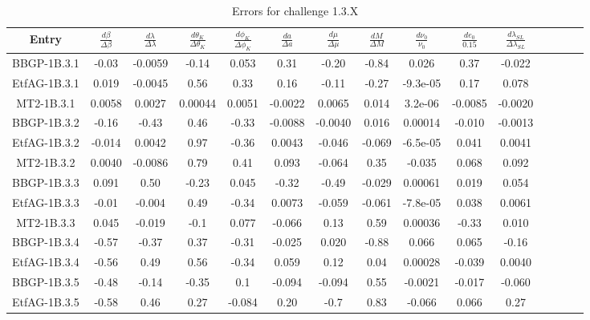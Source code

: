 \documentclass{iopart}
\begin{document}
 \begin{table}
\caption{\label{EMRI1} Errors for challenge 1.3.X}
\begin{tabular}{|c|c|c|c|c|c|c|c|c|c|c|c|c|c|c|}
\hline
Entry &  $\frac{d\beta}{\Delta\beta}$ & 
$\frac{d\lambda}{\Delta\lambda}$ &
 $\frac{d\theta_K}{\Delta\theta_K}$ & $\frac{d\phi_K}{\Delta\phi_K}$ 
 & $\frac{da}{\Delta a}$ & $\frac{d\mu}{\Delta\mu}$ & 
 $\frac{dM}{\Delta M}$ &  $\frac{d\nu_0}{\nu_0}$ 
  &  $\frac{de_0}{0.15}$  & 
 $\frac{d\lambda_{SL}}{\Delta\lambda_{SL}}$ \\ 
\hline
BBGP-1B.3.1 & -0.03   &   -0.0059   &   -0.14   &   0.053   &   0.31   &   -0.20   &   -0.84   &   0.026    &   0.37     &   -0.022   \\
EtfAG-1B.3.1  & 0.019   &   -0.0045   &   0.56   &   0.33   &   0.16   &   -0.11   &   -0.27   &   -9.3e-05    &   0.17     &   0.078    \\
MT2-1B.3.1  &  0.0058   &   0.0027   &   0.00044   &   0.0051   &   -0.0022   &   0.0065   &   0.014   &   3.2e-06      &   -0.0085    &   -0.0020   \\
\hline
BBGP-1B.3.2  &  -0.16   &   -0.43   &   0.46   &   -0.33   &   -0.0088   &   -0.0040   &   0.016   &   0.00014     &   -0.010    &   -0.0013   \\
EtfAG-1B.3.2  &  -0.014   &   0.0042   &   0.97   &   -0.36   &   0.0043   &   -0.046   &   -0.069   &   -6.5e-05     &   0.041     &   0.0041  \\
MT2-1B.3.2  & 0.0040   &   -0.0086   &   0.79   &   0.41   &   0.093   &   -0.064   &   0.35   &   -0.035    &   0.068    &   0.092    \\
\hline
BBGP-1B.3.3 &   0.091   &   0.50   &   -0.23   &   0.045   &   -0.32   &   -0.49   &   -0.029   &   0.00061      &   0.019     &   0.054   \\
EtfAG-1B.3.3  &  -0.01   &   -0.004   &   0.49   &   -0.34   &   0.0073   &   -0.059   &   -0.061   &   -7.8e-05    &   0.038      &   0.0061  \\
MT2-1B.3.3  &  0.045   &   -0.019   &   -0.1   &   0.077   &   -0.066   &   0.13   &   0.59   &   0.00036   &   -0.33     &   0.010  \\
\hline
BBGP-1B.3.4 &  -0.57   &   -0.37   &   0.37   &   -0.31   &   -0.025   &   0.020   &   -0.88   &   0.066     &   0.065     &   -0.16   \\
EtfAG-1B.3.4 & -0.56   &   0.49   &   0.56   &   -0.34   &   0.059   &   0.12   &   0.04   &   0.00028    &   -0.039    &   0.0040   \\
\hline
BBGP-1B.3.5 &  -0.48   &   -0.14   &   -0.35   &   0.1   &   -0.094   &   -0.094   &   0.55   &   -0.0021    &   -0.017      &   -0.060  \\
EtfAG-1B.3.5 &  -0.58   &   0.46   &   0.27   &   -0.084   &   0.20   &   -0.7   &   0.83   &   -0.066     &   0.066     &   0.27  \\
\hline
\end{tabular}
\end{table}
\end{document}
